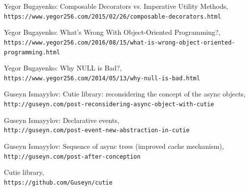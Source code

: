 \documentclass{article}
\begin{document}
\begin{thebibliography}{9}

Yegor Bugayenko: Composable Decorators vs. Imperative Utility Methods,
\\\texttt{https://www.yegor256.com/2015/02/26/composable-decorators.html}

Yegor Bugayenko: What's Wrong With Object-Oriented Programming?,
\\\texttt{https://www.yegor256.com/2016/08/15/what-is-wrong-object-oriented-programming.html}

Yegor Bugayenko: Why NULL is Bad?,
\\\texttt{https://www.yegor256.com/2014/05/13/why-null-is-bad.html}

Guseyn Ismayylov: Cutie library: reconsidering the concept of the async objects,
\\\texttt{http://guseyn.com/post-reconsidering-async-object-with-cutie}

Guseyn Ismayylov: Declarative events,
\\\texttt{http://guseyn.com/post-event-new-abstraction-in-cutie}

Guseyn Ismayylov: Sequence of async trees (improved cache mechanism),
\\\texttt{http://guseyn.com/post-after-conception}

Cutie library,
\\\texttt{https://github.com/Guseyn/cutie}

\end{thebibliography}

\newpage

\tableofcontents
\end{document}
